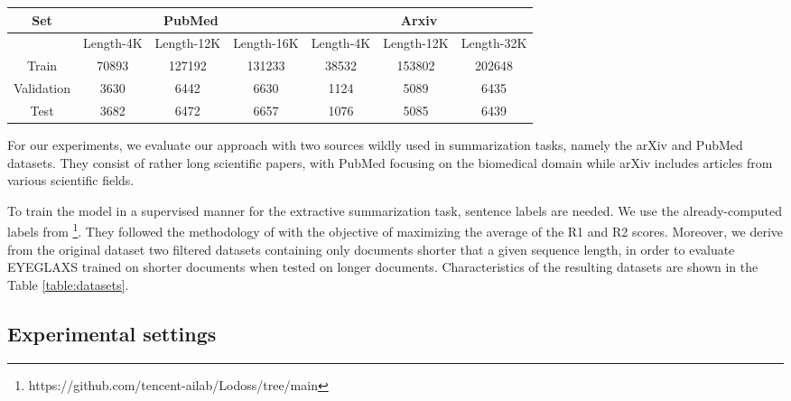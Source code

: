 \begin{table*}[t]
    \small
    \centering
    \begin{tabular}{|c|c|c|c|c|c|c|} %
        \hline
        Set& \multicolumn{3}{|c|}{PubMed} & \multicolumn{3}{|c|}{Arxiv} \\ %
        \hline
        & Length-4K& Length-12K& Length-16K& Length-4K& Length-12K& Length-32K\\ %
        \hline
         Train&  70893&  127192&  131233&  38532&  153802&  202648\\ %
        \hline
         Validation&  3630&  6442&  6630&  1124&  5089&  6435\\
        \hline
         Test&  3682&  6472&  6657&  1076&  5085&  6439\\ \hline
    \end{tabular}
    \caption{The datasets we used in the experiments. cell values correspond to the number of documents for each dataset and split. Pubmed-16k and Arxiv-32k have been truncated from original datasets, contrary to the other datasets where longer documents have been filtered out.}
    \label{table:datasets}
\end{table*}

For our experiments, we evaluate our approach with two sources wildly used in summarization tasks, namely the arXiv and PubMed datasets\cite{cohan-etal-2018-discourse}. They consist of rather long scientific papers, with PubMed focusing on the biomedical domain while arXiv includes articles from various scientific fields.

To train the model in a supervised manner for the extractive summarization task, sentence labels are needed. We use the already-computed labels from \cite{cho-etal-2022-toward}\footnote{https://github.com/tencent-ailab/Lodoss/tree/main}. They followed the methodology of \cite{kedzie-etal-2018-content} with the objective of maximizing the average of the R1 and R2 scores. Moreover, we derive from the original dataset two filtered datasets containing only documents shorter that a given sequence length, in order to evaluate EYEGLAXS trained on shorter documents when tested on longer documents.
Characteristics of the resulting datasets are shown in the Table \ref{table:datasets}.

\subsection{Experimental settings}
\label{section:experimental_setting}

